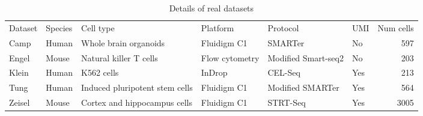 \begin{table}
\caption{\label{tab:datasets}Details of real datasets}
\begin{tabular}[t]{l l l l l l r}
Dataset & Species & Cell type & Platform & Protocol & UMI & Num cells\\
Camp & Human & Whole brain organoids & Fluidigm C1 & SMARTer & No & 597\\
Engel & Mouse & Natural killer T cells & Flow cytometry & Modified Smart-seq2 & No & 203\\
Klein & Human & K562 cells & InDrop & CEL-Seq & Yes & 213\\
Tung & Human & Induced pluripotent stem cells & Fluidigm C1 & Modified SMARTer & Yes & 564\\
Zeisel & Mouse & Cortex and hippocampus cells & Fluidigm C1 & STRT-Seq & Yes & 3005\\
\end{tabular}
\end{table}